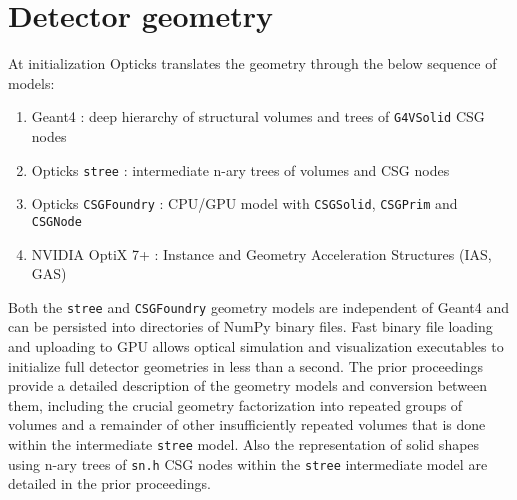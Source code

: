 \documentclass{webofc}
\begin{document}
\section{Detector geometry} 
\label{secgeom}%
At initialization Opticks translates the geometry through the below sequence of models:
%
\begin{enumerate}
\item Geant4 : deep hierarchy of structural volumes and trees of {\tt G4VSolid} CSG nodes
\item Opticks {\tt stree} : intermediate n-ary trees of volumes and CSG nodes
\item Opticks {\tt CSGFoundry} : CPU/GPU model with {\tt CSGSolid}, {\tt CSGPrim} and {\tt CSGNode} 
\item NVIDIA OptiX 7+ : Instance and Geometry Acceleration Structures (IAS, GAS)
\end{enumerate}  
%
%
Both the {\tt stree} and {\tt CSGFoundry} geometry models are independent of Geant4 and can be persisted into directories of NumPy\cite{numpy} binary files. 
Fast binary file loading and uploading to GPU allows optical simulation and visualization
executables to initialize full detector geometries in less than a second.  
The prior proceedings\cite{chep2023} provide a detailed description of the geometry models and conversion between them,
including the crucial geometry factorization into repeated groups of volumes and a remainder of 
other insufficiently repeated volumes that is done within the intermediate {\tt stree} model.
Also the representation of solid shapes using n-ary trees of {\tt sn.h} CSG nodes within  
the {\tt stree} intermediate model are detailed in the prior proceedings. 
%
%
%
\end{document}
